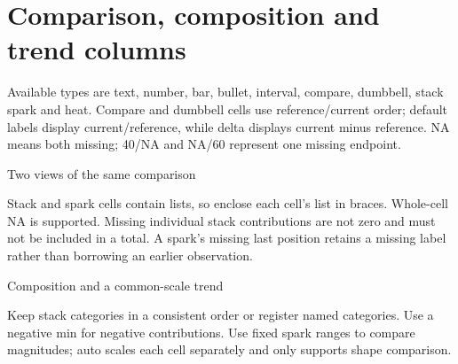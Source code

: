 \section{Comparison, composition and trend columns}
Available types are text, number, bar, bullet, interval, compare, dumbbell, stack
spark and heat. Compare and dumbbell cells use reference/current order; default labels
display current/reference, while delta displays current minus reference.
NA means both missing; 40/NA and NA/60 represent one missing endpoint.
\begin{demo}{Two views of the same comparison}
\begin{center}
\begin{gradtable}[align=c,header align=c,text width=22mm,graphic width=32mm,
  label width=12mm,column sep=6pt,row stretch=1.8]
\end{gradtable}
\end{center}
\end{demo}
Stack and spark cells contain lists, so enclose each cell's list in braces.
Whole-cell NA is supported. Missing individual stack contributions are not zero
and must not be included in a total. A spark's missing last position retains a
missing label rather than borrowing an earlier observation.
\begin{demo}{Composition and a common-scale trend}
\begin{center}
\begin{gradtable}[align=c,header align=c,text width=22mm,graphic width=32mm,
  label width=12mm,column sep=6pt,row stretch=1.8]
\end{gradtable}
\end{center}
\end{demo}
Keep stack categories in a consistent order or register named categories.
Use a negative min for negative contributions. Use fixed spark ranges to compare
magnitudes; auto scales each cell separately and only supports shape comparison.
